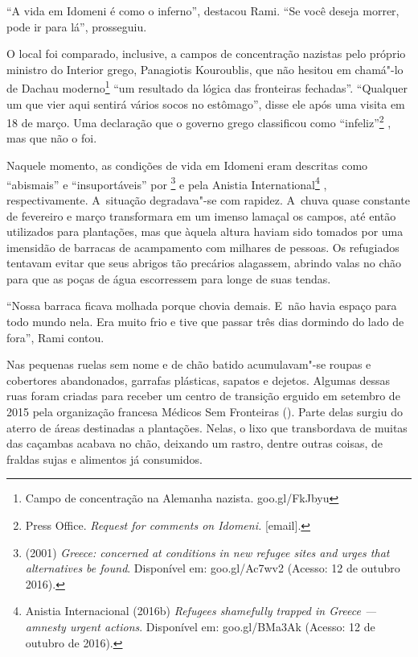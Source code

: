 ``A vida em Idomeni é como o inferno'', destacou Rami. ``Se você deseja
morrer, pode ir para lá'', prosseguiu.

O local foi comparado, inclusive, a campos de concentração nazistas pelo próprio
ministro do Interior grego, Panagiotis Kouroublis, que não hesitou em
chamá"-lo de Dachau moderno\footnote{ Campo de concentração na Alemanha nazista.  goo.gl/FkJbyu }
 ``um resultado da
lógica das fronteiras fechadas''. ``Qualquer um que vier aqui sentirá
vários socos no estômago'', disse ele após uma visita em 18 de março.
Uma declaração que o governo grego classificou como
``infeliz''\footnote{ Press Office. \emph{Request for comments on
Idomeni}\emph{.} {[}email{]}.} , mas que não o foi.

Naquele momento, as condições de vida em Idomeni eram descritas como
``abismais'' e ``insuportáveis'' por \footnote{  (2001) \emph{Greece:  concerned at
conditions in new refugee sites and urges that alternatives be found}.
Disponível em:
goo.gl/Ac7wv2
(Acesso: 12 de outubro 2016).}  e
pela  Anistia International\footnote{ Anistia Internacional (2016b) \emph{Refugees
shamefully trapped in Greece --- amnesty urgent actions}. Disponível em:
goo.gl/BMa3Ak
(Acesso: 12 de outubro de 2016).} ,
respectivamente. A~situação degradava"-se com rapidez. A~chuva quase
constante de fevereiro e março transformara em um imenso lamaçal os
campos, até então utilizados para plantações, mas que àquela altura
haviam sido tomados por uma imensidão de barracas de acampamento com
milhares de pessoas. Os refugiados tentavam evitar que seus abrigos tão precários
alagassem, abrindo valas no chão para que as poças de água escorressem para longe de suas tendas.

``Nossa barraca ficava molhada porque chovia demais. E~não havia espaço
para todo mundo nela. Era muito frio e tive que passar
três dias dormindo do lado de fora'', Rami contou.

Nas pequenas ruelas sem nome e de chão batido acumulavam"-se roupas e
cobertores abandonados, garrafas plásticas, sapatos e dejetos. Algumas
dessas ruas foram criadas para receber um centro de transição erguido em
setembro de 2015 pela organização francesa Médicos Sem Fronteiras ().
Parte delas surgiu do aterro de áreas destinadas a plantações. Nelas, o
lixo que transbordava de muitas das caçambas acabava no chão, deixando
um rastro, dentre outras coisas, de fraldas sujas e alimentos já consumidos.

